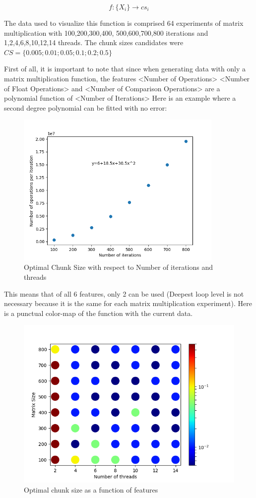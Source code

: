 \documentclass[12pt]{article}
\begin{document}
$$f:\{X_i\} \rightarrow cs_i$$

The data used to visualize this function is comprised 64 experiments of matrix multiplication with 100,200,300,400, 500,600,700,800 iterations and 1,2,4,6,8,10,12,14 threads. The chunk sizes candidates were $CS=\{0.005; 0.01 ;0.05; 0.1; 0.2; 0.5\}$

First of all, it is important to note that since when generating data with only a matrix multiplication function, the features <Number of Operations> <Number of Float Operations> and <Number of Comparison Operations> are a polynomial function of <Number of Iterations>
Here is an example where a second degree polynomial can be fitted with no error:

\begin{figure}[H]
	\centering
	\includegraphics[width=100mm]{polynomial_fit.png}
	\caption{Optimal Chunk Size with respect to Number of iterations and threads}
\end{figure}

This means that of all 6 features, only 2 can be used (Deepest loop level is not necessary because it is the same for each matrix multiplication experiment). Here is a punctual color-map of the function with the current data.

\begin{figure}[H]
	\centering
	\includegraphics[width=120mm]{function_top_view_first.png}
	\caption{Optimal chunk size as a function of features}
\end{figure}
\end{document}
